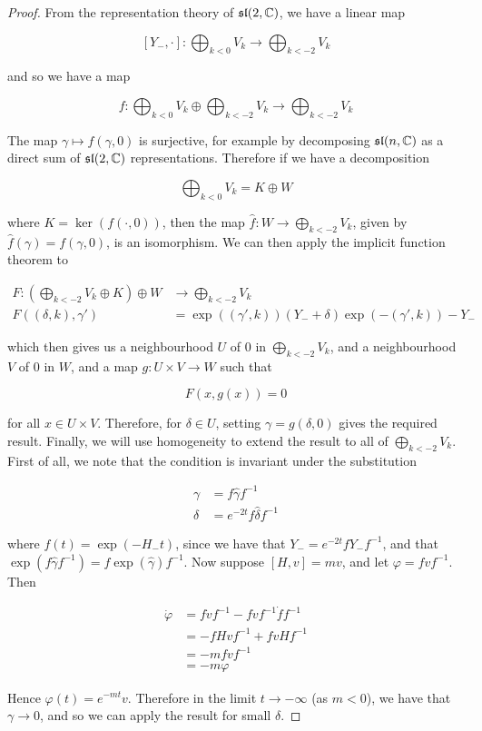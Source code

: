 \documentclass{article}
\renewcommand{\sl}{\mathfrak{sl}}
\begin{document}
\begin{proof}
    From the representation theory of \(\sl(2, \C)\), we have a linear map

    \[[Y_-, \cdot] : \bigoplus_{k < 0}V_k \to \bigoplus_{k < -2}V_k\]
    
    and so we have a map 

    \[f : \bigoplus_{k < 0}V_k \oplus \bigoplus_{k < -2}V_k \to \bigoplus_{k < -2}V_k\]
    
    The map \(\gamma \mapsto f(\gamma, 0)\) is surjective, for example by decomposing \(\sl(n, \C)\) as a direct sum of \(\sl(2, \C)\) representations. Therefore if we have a decomposition

    \[\bigoplus_{k < 0}V_k = K \oplus W\]

    where \(K = \ker(f(\cdot, 0))\), then the map \(\hat f : W \to \bigoplus\limits_{k < -2}V_k\), given by \(\hat f(\gamma) = f(\gamma, 0)\), is an isomorphism. We can then apply the implicit function theorem to

    \begin{align*}
        F : \left(\bigoplus_{k < -2}V_k \oplus K\right) \oplus W &\to \bigoplus_{k < -2}V_k \\
        F((\delta, k), \gamma') &= \exp((\gamma', k))(Y_- + \delta)\exp(-(\gamma', k)) - Y_-
    \end{align*}

    which then gives us a neighbourhood \(U\) of \(0\) in \(\bigoplus\limits_{k < -2}V_k\), and a neighbourhood \(V\) of \(0\) in \(W\), and a map \(g : U \times V \to W\) such that

    \[F(x, g(x)) = 0\]

    for all \(x \in U \times V\). Therefore, for \(\delta \in U\), setting \(\gamma = g(\delta, 0)\) gives the required result. Finally, we will use homogeneity to extend the result to all of \(\bigoplus \limits_{k < -2}V_k\). First of all, we note that the condition is invariant under the substitution

    \begin{align*}
        \gamma &= f\hat\gamma f^{-1} \\
        \delta &= e^{-2t}f\hat\delta f^{-1}
    \end{align*}

    where \(f(t) = \exp(-H_-t)\), since we have that \(Y_- = e^{-2t}fY_-f^{-1}\), and that \(\exp(f\hat\gamma f^{-1}) = f\exp(\hat\gamma)f^{-1}\). Now suppose \([H, v] = mv\), and let \(\varphi = fvf^{-1}\). Then

    \begin{align*}
        \dot\varphi &= f\dot vf^{-1} - fvf^{-1}\dot f f^{-1} \\
        &= -fHvf^{-1} + fvHf^{-1} \\
        &= -mfvf^{-1} \\
        &= -m\varphi
    \end{align*}

    Hence \(\varphi(t) = e^{-mt}v\). Therefore in the limit \(t \to -\infty\) (as \(m < 0\)), we have that \(\gamma \to 0\), and so we can apply the result for small \(\delta\).
\end{proof}
\end{document}
